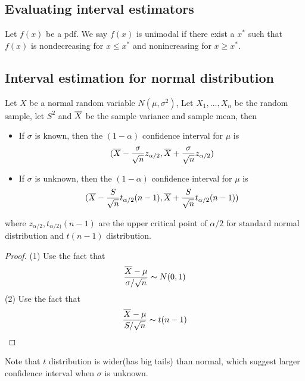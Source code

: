 \begin{refsection}
\subsection{Evaluating interval estimators}
\begin{definition}
	Let $f(x)$ be a pdf. We say $f(x)$ is unimodal if there exist a $x^*$ such that $f(x)$ is nondecreasing for $x\leq x^*$ and nonincreasing for $x \geq x^*$.
\end{definition}


\subsection{Interval estimation for normal distribution}



\begin{lemma}
Let $X$ be a normal random variable $N(\mu,\sigma^2)$, Let $X_1,...,X_n$ be the random sample, let $S^2$ and $\overline{X}$ be the sample variance and sample mean, then
\begin{itemize}
	\item If $\sigma$ is known, then the $(1-\alpha)$ confidence interval for $\mu$ is
	$$(\overline{X} - \frac{\sigma}{\sqrt{n}}z_{\alpha/2},\overline{X} + \frac{\sigma}{\sqrt{n}}z_{\alpha/2})$$
	\item If $\sigma$ is unknown, then the $(1-\alpha)$ confidence interval for $\mu$ is
	$$(\overline{X} - \frac{S}{\sqrt{n}}t_{\alpha/2}(n-1),\overline{X} + \frac{S}{\sqrt{n}}t_{\alpha/2}(n-1))$$
\end{itemize}
where $z_{\alpha/2},t_{\alpha/2)}(n-1)$ are the upper critical point of $\alpha/2$ for standard normal distribution and $t(n-1)$ distribution.
\end{lemma}
\begin{proof}
(1) Use the fact that 
$$\frac{\overline{X}-\mu}{\sigma/\sqrt{n}} \sim N(0,1)$$
(2) Use the fact that
$$\frac{\overline{X}-\mu}{S/\sqrt{n}} \sim t(n-1)$$
\end{proof}

\begin{remark}
Note that $t$ distribution is wider(has big tails) than normal, which suggest larger confidence interval when $\sigma$ is unknown.
\end{remark}




\end{refsection}
